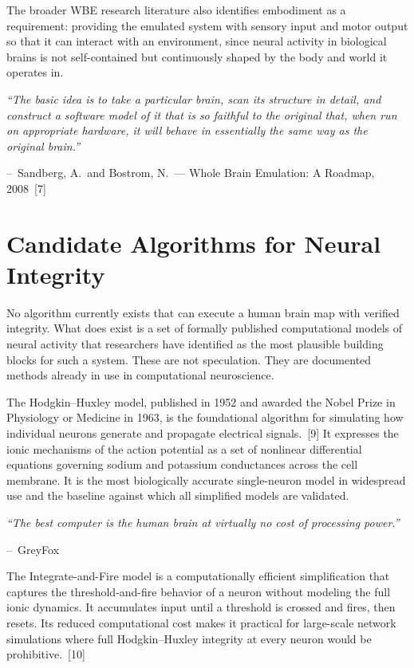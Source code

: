 \documentclass[11pt,a4paper]{article}
\renewenvironment{quote}
  {\list{}{\leftmargin=2.2em\rightmargin=2.2em\topsep=0.4em\parsep=0.3em}%
   \item\relax\itshape}
  {\endlist}
\newcommand{\attrib}[1]{\par\vspace{0.2em}\normalfont\small\hspace*{0em}--\ #1\par}
\begin{document}
The broader WBE research literature also identifies embodiment as a requirement: providing the emulated system with sensory input and motor output so that it can interact with an environment, since neural activity in biological brains is not self-contained but continuously shaped by the body and world it operates in.

\begin{quote}
``The basic idea is to take a particular brain, scan its structure in detail, and construct a software model of it that is so faithful to the original that, when run on appropriate hardware, it will behave in essentially the same way as the original brain.''
\attrib{Sandberg, A.\ and Bostrom, N.\ --- Whole Brain Emulation: A Roadmap, 2008~[7]}
\end{quote}

\section{Candidate Algorithms for Neural Integrity}

No algorithm currently exists that can execute a human brain map with verified integrity. What does exist is a set of formally published computational models of neural activity that researchers have identified as the most plausible building blocks for such a system. These are not speculation. They are documented methods already in use in computational neuroscience.

The Hodgkin--Huxley model, published in 1952 and awarded the Nobel Prize in Physiology or Medicine in 1963, is the foundational algorithm for simulating how individual neurons generate and propagate electrical signals.~[9] It expresses the ionic mechanisms of the action potential as a set of nonlinear differential equations governing sodium and potassium conductances across the cell membrane. It is the most biologically accurate single-neuron model in widespread use and the baseline against which all simplified models are validated.

\begin{quote}
``The best computer is the human brain at virtually no cost of processing power.''
\attrib{GreyFox}
\end{quote}

The Integrate-and-Fire model is a computationally efficient simplification that captures the threshold-and-fire behavior of a neuron without modeling the full ionic dynamics. It accumulates input until a threshold is crossed and fires, then resets. Its reduced computational cost makes it practical for large-scale network simulations where full Hodgkin--Huxley integrity at every neuron would be prohibitive.~[10]
\end{document}
